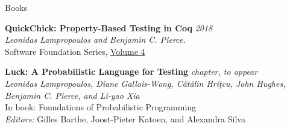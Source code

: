\documentclass{resume} %
\begin{document}
\newcommand{\pub}[4]{
  {\bf #1} \hfill {\href{https://lemonidas.github.io/pdf/#2}{\bf \em #4}}\\
  {#3}
  }

\newcommand{\pubtwo}[6]{
  {\bf #1} \hfill {\href{https://lemonidas.github.io/pdf/#2}{\bf \em #4}}, {\href{https://lemonidas.github.io/pdf/#5}{\bf \em #6}}\\
  {#3}
  }

\newcommand{\pubsub}[5]{
  {\bf #1:} \hfill {\href{https://lemonidas.github.io/pdf/#2}{\bf \em #4}}\\
  {\bf #5}\\
  {#3}
  }

\begin{rSection}{Books}

  {\bf QuickChick: Property-Based Testing in Coq} \hfill {\em 2018}\\
  {\em Leonidas Lampropoulos and Benjamin C. Pierce.}\\
  {Software Foundation Series, \href{https://softwarefoundations.cis.upenn.edu}{Volume 4}}

  {\bf Luck: A Probabilistic Language for Testing} \hfill {\em chapter, to appear}\\
  {\em Leonidas Lampropoulos, Diane Gallois-Wong, C\u{a}t\u{a}lin Hri\c{t}cu, John Hughes, Benjamin C. Pierce, and Li-yao Xia}\\
  In book: {Foundations of Probabilistic Programming} \\
  {\em Editors:} {Gilles Barthe, Joost-Pieter Katoen, and Alexandra Silva}\\
  
\end{rSection}
\end{document}
